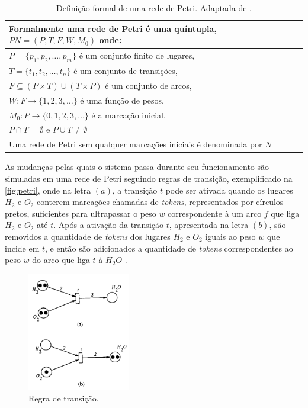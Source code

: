 \begin{table}[ht]
    \centering
    \begin{tabular}{|l|}
         \hline
         Formalmente uma rede de Petri é uma quíntupla, $PN = (P,T,F,W,M_0)$ onde: \\ \hline
         $P = \{p_1,p_2,\ldots,p_m\}$ é um conjunto finito de lugares, \\
         $T = \{t_1,t_2,\ldots,t_n\}$ é um conjunto de transições, \\
         $F \subseteq (P \times T) \cup (T \times P)$ é um conjunto de arcos, \\
         $W: F \to \{1,2,3,\ldots\} $ é uma função de pesos, \\
         $M_0: P \to \{0,1,2,3,\ldots\}$ é a marcação inicial, \\
         $P \cap T = \emptyset$ e $P \cup T \neq \emptyset$ \\
         Uma rede de Petri sem qualquer marcações iniciais é denominada por $N$ \\
         \hline
    \end{tabular}
    \caption{Definição formal de uma rede de Petri. Adaptada de .}
    \label{tab:petri_form}
\end{table}

As mudanças pelas quais o sistema passa durante seu funcionamento são simuladas em uma rede de Petri seguindo regras de transição, exemplificado na \autoref{fig:petri}, onde na letra $(a)$, a transição $t$ pode ser ativada quando os lugares $H_2$ e $O_2$ conterem marcações chamadas de \textit{tokens}, representados por círculos pretos, suficientes para ultrapassar o peso $w$ correspondente à um arco $f$ que liga $H_2$ e $O_2$ até $t$. Após a ativação da transição $t$, apresentada na letra $(b)$, são removidos a quantidade de \textit{tokens} dos lugares $H_2$ e $O_2$ iguais ao peso $w$ que incide em $t$, e então são adicionados a quantidade de \textit{tokens} correspondentes ao peso $w$ do arco que liga $t$ à $H_2O$ \cite{murata:1989}.

\begin{figure}[ht]
    \centering
    \includegraphics[width=0.4\textwidth, keepaspectratio]{resources/petri.png}
    \caption{Regra de transição. \cite{murata:1989}}
    \label{fig:petri}
\end{figure}

